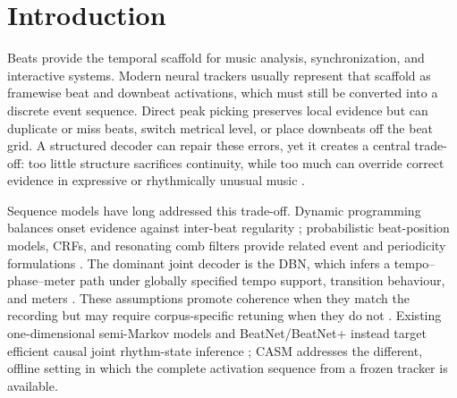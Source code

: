 \documentclass{article}
\begin{document}

\section{Introduction}
\label{sec:intro}
Beats provide the temporal scaffold for music analysis, synchronization, and
interactive systems. Modern neural trackers usually represent that scaffold as
framewise beat and downbeat activations, which must still be converted into a
discrete event sequence. Direct peak picking preserves local evidence but can
duplicate or miss beats, switch metrical level, or place downbeats off the beat
grid. A structured decoder can repair these errors, yet it creates a central
trade-off: too little structure sacrifices continuity, while too much can
override correct evidence in expressive or rhythmically unusual music
\cite{chiu2023localperiodicity,foscarin2024beat}.

Sequence models have long addressed this trade-off. Dynamic programming
balances onset evidence against inter-beat regularity
\cite{ellis2007beattracking}; probabilistic beat-position models, CRFs, and
resonating comb filters provide related event and periodicity formulations
\cite{korzeniowski2014crf,fillon2015crf,bock2015combfilter}. The dominant joint
decoder is the DBN, which infers a tempo--phase--meter path under globally
specified tempo support, transition behaviour, and meters
\cite{krebs2015dbn,bock2016joint}. These assumptions promote coherence when
they match the recording but may require corpus-specific retuning when they do
not \cite{ahn2026smcblindspot}. Existing one-dimensional semi-Markov models and
BeatNet/BeatNet+ instead target efficient causal joint rhythm-state inference
\cite{heydari2022semimarkov,heydari2021beatnet,heydari2024beatnetplus}; CASM
addresses the different, offline setting in which the complete activation
sequence from a frozen tracker is available.
\end{document}
